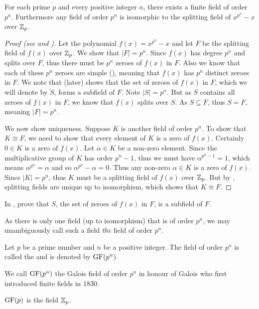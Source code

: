 \begin{theorem}\label{thrm-finite-field-is-unique}
    For each prime $p$ and every positive integer $n$, there exists a finite field of order $p^n$. Furthermore any field of order $p^n$ is isomorphic to the splitting field of $x^{p^n} - x$ over $\mathbb{Z}_p$.
\end{theorem}
\begin{proof}[Proof (see {\cite[Theorem 22.1]{gallian_2016}} and {\cite[Theorem 22.6]{judson_beezer_2022}})]
    Let the polynomial $f(x) = x^{p^n} - x$ and let $F$ be the splitting field of $f(x)$ over $\mathbb{Z}_p$. We show that $|F| = p^n$. Since $f(x)$ has degree $p^n$ and splits over $F$, thus there must be $p^n$ zeroes of $f(x)$ in $F$. Also we know that each of these $p^n$ zeroes are simple (), meaning that $f(x)$ has $p^n$ distinct zeroes in $F$. We note that  (later) shows that the set of zeroes of $f(x)$ in $F$, which we will denote by $S$, forms a subfield of $F$. Note $|S| = p^n$. But as $S$ contains all zeroes of $f(x)$ in $F$, we know that $f(x)$ splits over $S$. As $S \subseteq F$, thus $S = F$, meaning $|F| = p^n$.

    We now show uniqueness. Suppose $K$ is another field of order $p^n$. To show that $K \cong F$, we need to show that every element of $K$ is a zero of $f(x)$. Certainly $0 \in K$ is a zero of $f(x)$. Let $\alpha \in K$ be a non-zero element. Since the multiplicative group of $K$ has order $p^n - 1$, thus we must have $\alpha^{p^n-1} = 1$, which means $\alpha^{p^n} = \alpha$ and so $\alpha^{p^n}-\alpha = 0$. Thus any non-zero $\alpha \in K$ is a zero of $f(x)$. Since $|K| = p^n$, thus $K$ must be a splitting field of $f(x)$ over $\mathbb{Z}_p$. But by , splitting fields are unique up to isomorphism, which shows that $K \cong F$.
\end{proof}

\begin{exercise}\label{exercise-zeroes-of-polynomial-form-subfield}
    In , prove that $S$, the set of zeroes of $f(x)$ in $F$, is a subfield of $F$.
\end{exercise}

As there is only one field (up to isomorphism) that is of order $p^n$, we may unambiguously call such a field \textit{the} field of order $p^n$.

\begin{definition}
    Let $p$ be a prime number and $n$ be a positive integer. The field of order $p^n$ is called the  and is denoted by $\mathrm{GF}(p^n)$.
\end{definition}
\begin{remark}
    We call $\mathrm{GF}(p^n)$ the Galois field of order $p^n$ in honour of Galois who first introduced finite fields in 1830.
\end{remark}
\begin{remark}
    $\mathrm{GF}(p)$ is the field $\mathbb{Z}_p$.
\end{remark}

